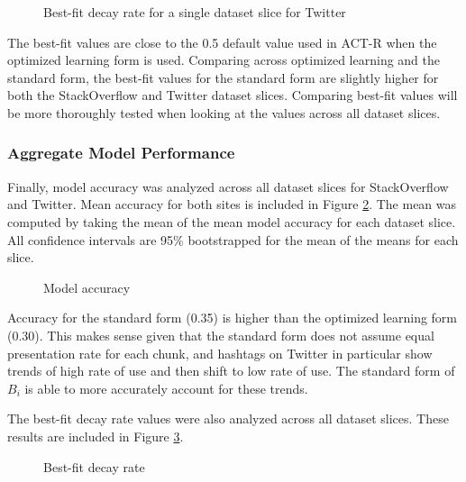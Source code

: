 \documentclass[man,floatsintext,donotrepeattitle]{apa6}
\begin{document}
\begin{figure}[!htbp]
  {%
    \setlength{\fboxsep}{0pt}%
    \setlength{\fboxrule}{1pt}%
    \hfill
    \hfill
    \caption{Best-fit decay rate for a single dataset slice for Twitter}
    \label{figPriorTwitterHistDsOL}
  }%
\end{figure}

The best-fit values are close to the 0.5 default value used in ACT-R when the optimized learning form is used.
Comparing across optimized learning and the standard form, the best-fit values for the standard form are slightly higher for both the StackOverflow and Twitter dataset slices.
Comparing best-fit values will be more thoroughly tested when looking at the values across all dataset slices.

\subsubsection{Aggregate Model Performance}

Finally, model accuracy was analyzed across all dataset slices for StackOverflow and Twitter.
Mean accuracy for both sites is included in Figure \ref{figPriorAcc}. 
The mean was computed by taking the mean of the mean model accuracy for each dataset slice.
All confidence intervals are 95\% bootstrapped for the mean of the means for each slice.

\begin{figure}[!htbp]
  \caption{Model accuracy}
  \label{figPriorAcc}
\end{figure}

Accuracy for the standard form (0.35) is higher than the optimized learning form (0.30).
This makes sense given that the standard form does not assume equal presentation rate for each chunk, and hashtags on Twitter in particular show trends of high rate of use and then shift to low rate of use. 
The standard form of $B_{i}$ is able to more accurately account for these trends.

The best-fit decay rate values were also analyzed across all dataset slices.
These results are included in Figure \ref{figPriorDecay}.

\begin{figure}[!htbp]
  \caption{Best-fit decay rate}
  \label{figPriorDecay}
\end{figure}
\end{document}
